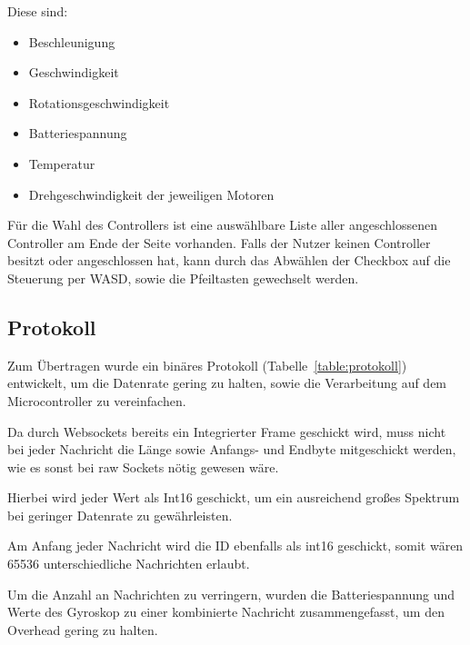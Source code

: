 Diese sind:\par

\begin{itemize}
	\item Beschleunigung 
	\item Geschwindigkeit
	\item Rotationsgeschwindigkeit
	\item Batteriespannung
	\item Temperatur
	\item Drehgeschwindigkeit der jeweiligen Motoren
\end{itemize}\par


\vspace{\baselineskip}
Für die Wahl des Controllers ist eine auswählbare Liste aller angeschlossenen Controller am Ende der Seite vorhanden. Falls der Nutzer keinen Controller besitzt oder angeschlossen hat, kann durch das Abwählen der Checkbox auf die Steuerung per WASD, sowie die Pfeiltasten gewechselt werden.\par

\subsection{Protokoll}
Zum Übertragen wurde ein binäres Protokoll (Tabelle~\ref{table:protokoll}) entwickelt, um die Datenrate gering zu halten, sowie die Verarbeitung auf dem Microcontroller zu vereinfachen.\par

Da durch Websockets bereits ein Integrierter Frame geschickt wird, muss nicht bei jeder Nachricht die Länge sowie Anfangs- und Endbyte mitgeschickt werden, wie es sonst bei raw Sockets nötig gewesen wäre.\par

Hierbei wird jeder Wert als Int16 geschickt, um ein ausreichend großes Spektrum bei geringer Datenrate zu gewährleisten. \par

Am Anfang jeder Nachricht wird die ID ebenfalls als int16 geschickt, somit wären 65536 unterschiedliche Nachrichten erlaubt.\par

Um die Anzahl an Nachrichten zu verringern, wurden die Batteriespannung und Werte des Gyroskop zu einer kombinierte Nachricht zusammengefasst, um den Overhead gering zu halten.\par

